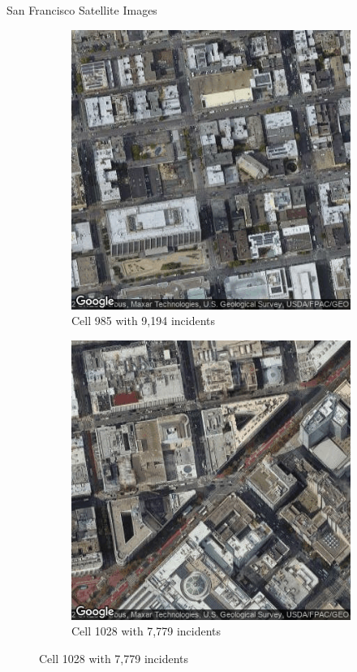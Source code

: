 \documentclass[10pt]{beamer}
\begin{document}
\begin{frame}{San Francisco Satellite Images}
\begin{figure}
\centering
\begin{subfigure}{.35\textwidth}
  \centering
  \includegraphics[width=0.7\linewidth]{985.png}
  \caption{Cell 985 with 9,194 incidents}
  \label{fig:sub1}
\end{subfigure}%
\begin{subfigure}{.35\textwidth}
  \centering
  \includegraphics[width=0.7\linewidth]{1028.png}
  \caption{Cell 1028 with 7,779 incidents}
  \label{fig:sub2}
\end{subfigure}


\end{figure}
\end{frame}
\end{document}
